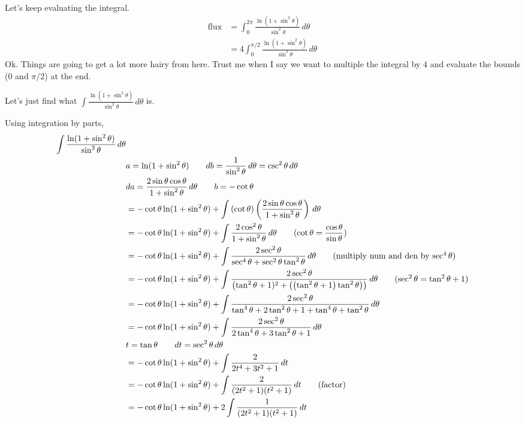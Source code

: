 \documentclass{article}
\newcommand{\lrp}[1]{\left( #1 \right)}
\begin{document}
Let's keep evaluating the integral.
\begin{align*}
    \text{flux}&=\int_0^{2\pi}\frac{\ln(1+\sin^2\theta)}{\sin^2\theta}\,d\theta\\
    &=4\int_0^{\pi/2}\frac{\ln(1+\sin^2\theta)}{\sin^2\theta}\,d\theta
\end{align*}
Ok. Things are going to get a lot more hairy from here. Trust me when I say we want to multiple the integral by $4$ and evaluate the bounds ($0$ and $\pi/2$) at the end.

Let's just find what $\displaystyle \int \frac{\ln (1+\sin^2\theta)}{\sin^2\theta}\,d\theta$ is.

Using integration by parts,
\begin{align*}
   \int \frac{\ln (1+\sin^2\theta)}{\sin^2\theta}\,d\theta&\\
   &a=\ln(1+\sin^2\theta)\hspace{2em}db=\frac{1}{\sin^2\theta}\,d\theta=\csc^2\theta\,d\theta\\
   &da=\frac{2\sin\theta\cos\theta}{1+\sin^2\theta}\,d\theta\hspace{2em}b=-\cot\theta\\
   &=-\cot \theta \ln (1+\sin^2\theta)+\int\lrp{\cot \theta}\lrp{\frac{2\sin\theta \cos\theta}{1+\sin^2\theta}}\,d\theta\\
   &=-\cot \theta \ln (1+\sin^2\theta)+\int\frac{2\cos^2\theta}{1+\sin^2\theta}\,d\theta\tag{$\cot\theta=\dfrac{\cos \theta}{\sin \theta}$}\\
    &=-\cot \theta \ln (1+\sin^2\theta)+\int\frac{2\sec^2\theta}{\sec^4\theta +\sec^2\theta\tan^2\theta}\,d\theta\tag{multiply num and den by $\sec^4\theta$}\\
    &=-\cot \theta \ln (1+\sin^2\theta)+\int\frac{2\sec^2\theta}{\lrp{\tan^2\theta+1)^2+\lrp{\lrp{\tan^2\theta+1}\tan^2\theta}}}\,d\theta\tag{$\sec^2\theta=\tan^2\theta+1$}\\
    &=-\cot \theta \ln (1+\sin^2\theta)+\int\frac{2\sec^2\theta}{\tan^4\theta+2\tan^2\theta+1+\tan^4\theta+\tan^2\theta}\,d\theta\\
    &=-\cot \theta \ln (1+\sin^2\theta)+\int\frac{2\sec^2\theta}{2\tan^4\theta + 3\tan^2\theta+1}\,d\theta\\
    &t=\tan \theta\hspace{2em}dt=\sec^2\theta\,d\theta\\
    &=-\cot \theta \ln (1+\sin^2\theta)+\int\frac{2}{2t^4+3t^2+1}\,dt\\
    &=-\cot \theta \ln (1+\sin^2\theta)+\int\frac{2}{(2t^2+1)(t^2+1)}\,dt\tag{factor}\\
    &=-\cot \theta \ln (1+\sin^2\theta)+2\int\frac{1}{(2t^2+1)(t^2+1)}\,dt
\end{align*}
\end{document}
